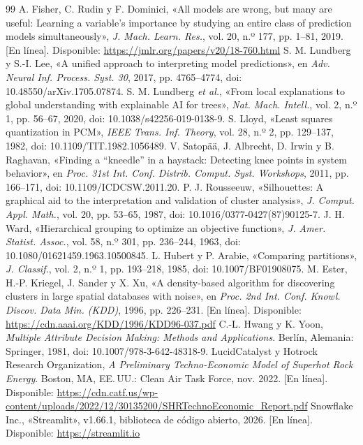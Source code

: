 \documentclass[journal,letterpaper]{IEEEtran}
\begin{document}
\begin{thebibliography}{99}
 A. Fisher, C. Rudin y F. Dominici, «All models are wrong, but many are useful: Learning a variable's importance by studying an entire class of prediction models simultaneously», \emph{J. Mach. Learn. Res.}, vol. 20, n.º 177, pp. 1--81, 2019. [En línea]. Disponible: \url{https://jmlr.org/papers/v20/18-760.html}
 S. M. Lundberg y S.-I. Lee, «A unified approach to interpreting model predictions», en \emph{Adv. Neural Inf. Process. Syst. 30}, 2017, pp. 4765--4774, doi: 10.48550/arXiv.1705.07874.
 S. M. Lundberg \emph{et al.}, «From local explanations to global understanding with explainable AI for trees», \emph{Nat. Mach. Intell.}, vol. 2, n.º 1, pp. 56--67, 2020, doi: 10.1038/s42256-019-0138-9.
 S. Lloyd, «Least squares quantization in PCM», \emph{IEEE Trans. Inf. Theory}, vol. 28, n.º 2, pp. 129--137, 1982, doi: 10.1109/TIT.1982.1056489.
 V. Satopää, J. Albrecht, D. Irwin y B. Raghavan, «Finding a ``kneedle'' in a haystack: Detecting knee points in system behavior», en \emph{Proc. 31st Int. Conf. Distrib. Comput. Syst. Workshops}, 2011, pp. 166--171, doi: 10.1109/ICDCSW.2011.20.
 P. J. Rousseeuw, «Silhouettes: A graphical aid to the interpretation and validation of cluster analysis», \emph{J. Comput. Appl. Math.}, vol. 20, pp. 53--65, 1987, doi: 10.1016/0377-0427(87)90125-7.
 J. H. Ward, «Hierarchical grouping to optimize an objective function», \emph{J. Amer. Statist. Assoc.}, vol. 58, n.º 301, pp. 236--244, 1963, doi: 10.1080/01621459.1963.10500845.
 L. Hubert y P. Arabie, «Comparing partitions», \emph{J. Classif.}, vol. 2, n.º 1, pp. 193--218, 1985, doi: 10.1007/BF01908075.
 M. Ester, H.-P. Kriegel, J. Sander y X. Xu, «A density-based algorithm for discovering clusters in large spatial databases with noise», en \emph{Proc. 2nd Int. Conf. Knowl. Discov. Data Min. (KDD)}, 1996, pp. 226--231. [En línea]. Disponible: \url{https://cdn.aaai.org/KDD/1996/KDD96-037.pdf}
 C.-L. Hwang y K. Yoon, \emph{Multiple Attribute Decision Making: Methods and Applications}. Berlín, Alemania: Springer, 1981, doi: 10.1007/978-3-642-48318-9.
 LucidCatalyst y Hotrock Research Organization, \emph{A Preliminary Techno-Economic Model of Superhot Rock Energy}. Boston, MA, EE.\,UU.: Clean Air Task Force, nov. 2022. [En línea]. Disponible: \url{https://cdn.catf.us/wp-content/uploads/2022/12/30135200/SHRTechnoEconomic_Report.pdf}
 Snowflake Inc., «Streamlit», v1.66.1, biblioteca de código abierto, 2026. [En línea]. Disponible: \url{https://streamlit.io}

\end{thebibliography}
\end{document}
